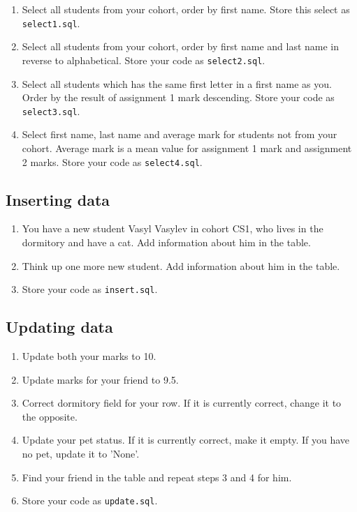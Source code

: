 \documentclass[12pt]{article}
\newcommand{\code}[1]{\texttt{#1}}
\begin{document}
\begin{enumerate}
\item Select all students from your cohort, order by first name. Store this select as \code{select1.sql}.

\item Select all students from your cohort, order by first name and last name  in reverse to alphabetical. Store your code as \code{select2.sql}.

\item Select all students which has the same first letter in a first name as you. Order by the result of assignment 1 mark descending. Store your code as \code{select3.sql}.

\item Select first name, last name and average mark for students not from your cohort. Average mark is a mean value for assignment 1 mark and assignment 2 marks. Store your code as \code{select4.sql}.

\end{enumerate}

\subsection*{Inserting data}

\begin{enumerate}

\item You have a new student Vasyl Vasylev in cohort CS1, who lives in the dormitory and have a cat. Add information about him in the table.

\item Think up one more new student. Add information about him in the table.

\item Store your code as \code{insert.sql}.

\end{enumerate}

\subsection*{Updating data}

\begin{enumerate}

\item Update both your marks to 10.

\item Update marks for your friend to 9.5.

\item Correct dormitory field for your row. If it is currently correct, change it to the opposite.

\item Update your pet status. If it is currently correct, make it empty. If you have no pet, update it to 'None'.

\item Find your friend in the table and repeat steps 3 and 4 for him.

\item Store your code as \code{update.sql}.

\end{enumerate}
\end{document}
